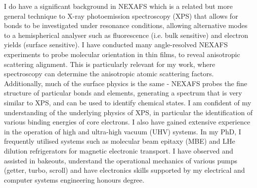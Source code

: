 \documentclass[10pt,a4paper,ragged2e,withhyper,paragraphstrue]{altacv}
\begin{document}
{    %
    I do have a significant background in NEXAFS which is a related but more general technique to X-ray photoemission spectroscopy (XPS) that allows for bonds to be investigated under resonance conditions, allowing alternative modes to a hemispherical analyser such as fluorescence (i.e. bulk sensitive) and electron yields (surface sensitive). I have conducted many angle-resolved NEXAFS experiments to probe molecular orientation in thin films, to reveal anisotropic scattering alignment. This is particularly relevant for my work, where spectroscopy can determine the anisotropic atomic scattering factors. Additionally, much of the surface physics is the same - NEXAFS probes the fine structure of particular bonds and elements, generating a spectrum that is very similar to XPS, and can be used to identify chemical states. I am confident of my understanding of the underlying physics of XPS, in particular the identification of various binding energies of core electrons.
    I also have gained extensive experience in the operation of high and ultra-high vacuum (UHV) systems. In my PhD, I frequently utilised systems such as molecular beam epitaxy (MBE) and LHe dilution refrigerators for magnetic electronic transport. I have observed and assisted in bakeouts, understand the operational mechanics of various pumps (getter, turbo, scroll) and have electronics skills supported by my electrical and computer systems engineering honours degree.

}
\end{document}
